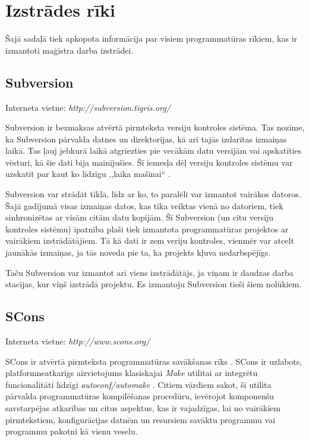 \section{Izstrādes rīki}\label{section:program:tools}
Šajā sadaļā tiek apkopota informācija par visiem programmatūras rīkiem, kas ir
izmantoti maģistra darba izstrādei.

\subsection{Subversion}
Interneta vietne: \emph{http://subversion.tigris.org/}

\noindent
Subversion ir bezmaksas atvērtā pirmteksta versiju kontroles sistēma. Tas
nozīme, ka Subversion pārvalda datnes un direktorijas, kā arī tajās
izdarītas izmaiņas laikā. Tas ļauj jebkurā laikā atgriezties pie vecākām datu
versijām vai apskatīties vēsturi, kā šie dati bija mainījušies. Šī iemesļa dēļ
versiju kontroles sistēmu var uzskatīt par kaut ko līdzīgu ,,laika mašīnai``
\cite{SVNBook}.

Subversion var strādāt tīklā, līdz ar ko, to paralēli var izmantot vairākos datoros.
Šajā gadījumā visas izmaiņas datos, kas tika veiktas vienā no datoriem, tiek
sinhronizētas ar visām citām datu kopijām. Šī Subversion (un citu versiju kontroles
sistēmu) īpatnība plaši tiek izmantota programmatūras projektos ar vairākiem
izstrādātājiem. Tā kā dati ir zem veriju kontroles, vienmēr var atcelt jaunākās
izmaiņas, ja tās noveda pie ta, ka projekts kļuva nedarbspējīgs.

Taču Subversion var izmantot arī viens izstrādātājs, ja viņam ir daudzas darba
stacijas, kur viņš izstrādā projektu. Es izmantoju Subversion tieši šiem nolūkiem.

\subsection{SCons}
Interneta vietne: \emph{http://www.scons.org/}

\noindent
SCons ir atvērtā pirmteksta programmatūras savākšanas rīks . SCons ir uzlabots, platformneatkarīgs aizvietojums klasiskajai
\emph{Make} utilitai ar integrētu funcionalitāti līdzīgi \emph{autoconf/automake}
\cite{SCons}. Citiem vārdiem sakot, šī utilita pārvalda programmatūras
kompilēšanas procedūru, ievērojot komponenšu savstarpējas atkarības un citus
aspektus, kas ir vajadzīgas, lai no vairākiem pirmtekstiem, konfigurācijas datnēm
un resursiem savāktu programmu vai programmu pakotni kā vienu veselu.

